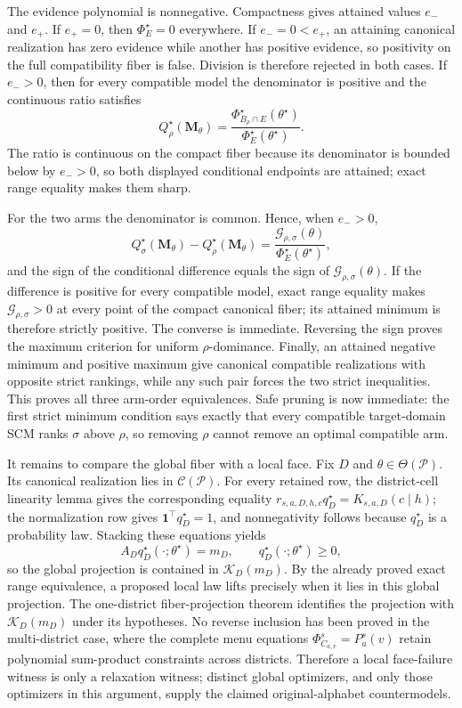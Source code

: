 The evidence polynomial is nonnegative.  Compactness gives attained values \(e_-\) and \(e_+\).  If \(e_+=0\), then \(\Phi_E^\star=0\) everywhere.  If \(e_-=0<e_+\), an attaining canonical realization has zero evidence while another has positive evidence, so positivity on the full compatibility fiber is false.  Division is therefore rejected in both cases.  If \(e_->0\), then for every compatible model the denominator is positive and the continuous ratio satisfies
\[
 Q_\rho^\star(\mathbf M_\theta)
 =\frac{\Phi_{B_\rho\cap E}^\star(\theta^\star)}
        {\Phi_E^\star(\theta^\star)}.
\]
The ratio is continuous on the compact fiber because its denominator is bounded below by \(e_->0\), so both displayed conditional endpoints are attained; exact range equality makes them sharp.

For the two arms the denominator is common.  Hence, when \(e_->0\),
\[
 Q_\sigma^\star(\mathbf M_\theta)-Q_\rho^\star(\mathbf M_\theta)
 =\frac{\mathcal G_{\rho,\sigma}(\theta)}
        {\Phi_E^\star(\theta^\star)},
\]
and the sign of the conditional difference equals the sign of \(\mathcal G_{\rho,\sigma}(\theta)\).  If the difference is positive for every compatible model, exact range equality makes \(\mathcal G_{\rho,\sigma}>0\) at every point of the compact canonical fiber; its attained minimum is therefore strictly positive.  The converse is immediate.  Reversing the sign proves the maximum criterion for uniform \(\rho\)-dominance.  Finally, an attained negative minimum and positive maximum give canonical compatible realizations with opposite strict rankings, while any such pair forces the two strict inequalities.  This proves all three arm-order equivalences.
Safe pruning is now immediate: the first strict minimum condition says exactly that every compatible target-domain SCM ranks \(\sigma\) above \(\rho\), so removing \(\rho\) cannot remove an optimal compatible arm.

It remains to compare the global fiber with a local face.  Fix \(D\) and \(\theta\in\Theta(\mathcal P)\).  Its canonical realization lies in \(\mathcal C(\mathcal P)\).  For every retained row, the district-cell linearity lemma gives the corresponding equality
\(
r_{s,a,D,h,c}q_D^\star=K_{s,a,D}(c\mid h)
\); the normalization row gives \(\mathbf 1^\top q_D^\star=1\), and nonnegativity follows because \(q_D^\star\) is a probability law.  Stacking these equations yields
\[
 A_Dq_D^\star(\cdot;\theta^\star)=m_D,
 \qquad q_D^\star(\cdot;\theta^\star)\geq0,
\]
so the global projection is contained in \(\mathcal K_D(m_D)\).  By the already proved exact range equivalence, a proposed local law lifts precisely when it lies in this global projection.  The one-district fiber-projection theorem identifies the projection with \(\mathcal K_D(m_D)\) under its hypotheses.  No reverse inclusion has been proved in the multi-district case, where the complete menu equations \(\Phi_{C_{a,v}}^s=P_a^s(v)\) retain polynomial sum-product constraints across districts.  Therefore a local face-failure witness is only a relaxation witness; distinct global optimizers, and only those optimizers in this argument, supply the claimed original-alphabet countermodels.
